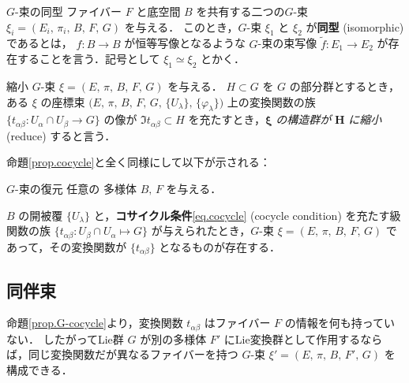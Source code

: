 \documentclass[geometry_main]{subfiles}
\begin{document}
\begin{mydef}[label=def.Gbundle_isomorphism]{$G$-束の同型}
	ファイバー $F$ と底空間 $B$ を共有する二つの$G$-束 $\xi_i = (E_i,\, \pi_i,\, B,\, F,\, G)$ を与える．
	このとき，$G$-束 $\xi_1$ と $\xi_2$ が\textbf{同型} (isomorphic) であるとは，
	$f \colon B \to B$ が恒等写像となるような $G$-束の束写像 $\tilde{f} \colon E_1 \to E_2$ が存在することを言う．記号として $\xi_1 \simeq \xi_2$ とかく．
\end{mydef}


\begin{mydef}[label=reduce]{縮小}
	$G$-束 $\xi = (E,\, \pi,\, B,\, F,\, G)$ を与える．
	$H \subset G$ を $G$ の部分群とするとき，ある $\xi$ の座標束 $\bigl(E,\, \pi,\, B,\, F,\, G,\, \{U_\lambda\},\, \{\varphi_\lambda\}\bigr)$ 上の変換関数の族 $\{ t_{\alpha\beta} \colon U_\alpha \cap U_\beta \to G\}$ の像が $\Im t_{\alpha\beta} \subset H$ を充たすとき，$\bm{\xi}$ \emph{の構造群が} $\bm{H}$ \emph{に縮小} (reduce) すると言う．
\end{mydef}

命題\ref{prop.cocycle}と全く同様にして以下が示される：

\begin{myprop}[label=prop.G-cocycle]{$G$-束の復元}
	任意の \cinfty 多様体 $B,\, F$ を与える．

	$B$ の開被覆 $\{U_\lambda\}$ と，\textbf{コサイクル条件}\eqref{eq.cocycle} (cocycle condition) を充たす\cinfty 級関数の族 $\{ t_{\alpha\beta} \colon U_\beta \cap U_\alpha \mapsto G \}$ が与えられたとき，$G$-束 $\xi = (E,\, \pi,\, B,\, F,\, G)$ であって，その変換関数が $\{t_{\alpha\beta}\}$ となるものが存在する．
\end{myprop}

\subsection{同伴束}

命題\ref{prop.G-cocycle}より，変換関数 $t_{\alpha\beta}$ はファイバー $F$ の情報を何も持っていない．
したがってLie群 $G$ が別の\cinfty 多様体 $F'$ にLie変換群として作用するならば，同じ変換関数だが異なるファイバーを持つ $G$-束 $\xi' = (E,\, \pi,\, B,\, F',\, G)$ を構成できる．
\end{document}
